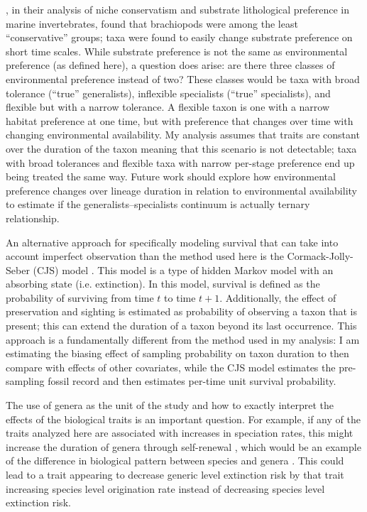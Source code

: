 \documentclass[11pt]{article}
\begin{document}
\citet{Hopkins2014a}, in their analysis of niche conservatism and substrate lithological preference in marine invertebrates, found that brachiopods were among the least ``conservative'' groups; taxa were found to easily change substrate preference on short time scales. While substrate preference is not the same as environmental preference (as defined here), a question does arise: are there three classes of environmental preference instead of two? These classes would be taxa with broad tolerance (``true'' generalists), inflexible specialists (``true'' specialists), and flexible but with a narrow tolerance. A flexible taxon is one with a narrow habitat preference at one time, but with preference that changes over time with changing environmental availability. My analysis assumes that traits are constant over the duration of the taxon meaning that this scenario is not detectable; taxa with broad tolerances and flexible taxa with narrow per-stage preference end up being treated the same way. Future work should explore how environmental preference changes over lineage duration in relation to environmental availability to estimate if the generalists--specialists continuum is actually ternary relationship.

An alternative approach for specifically modeling survival that can take into account imperfect observation than the method used here is the Cormack-Jolly-Seber (CJS) model \citep{Royle2008,Liow2008,Tomiya2013,Liow2010b}. This model is a type of hidden Markov model with an absorbing state (i.e. extinction). In this model, survival is defined as the probability of surviving from time \(t\) to time \(t + 1\). Additionally, the effect of preservation and sighting is estimated as probability of observing a taxon that is present; this can extend the duration of a taxon beyond its last occurrence. This approach is a fundamentally different from the method used in my analysis: I am estimating the biasing effect of sampling probability on taxon duration to then compare with effects of other covariates, while the CJS model estimates the pre-sampling fossil record and then estimates per-time unit survival probability.

The use of genera as the unit of the study and how to exactly interpret the effects of the biological traits is an important question. For example, if any of the traits analyzed here are associated with increases in speciation rates, this might increase the duration of genera through self-renewal \citep{Raup1991b,Raup1994}, which would be an example of the difference in biological pattern between species and genera \citep{Jablonski1987,Jablonski2007,Jablonski2008a}. This could lead to a trait appearing to decrease generic level extinction risk by that trait increasing species level origination rate instead of decreasing species level extinction risk. %
\end{document}

